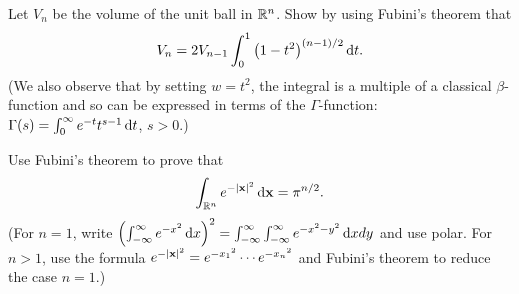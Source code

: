 \begin{problem}
  Let $V_n$ be the volume of the unit ball in $\mathbb{R}^n$. Show by using
  Fubini's theorem that
  \[
    V_n=2V_{n-1}\int_0^1\left(1-t^2\right)^{(n-1)/2}\mathop{}\!\mathrm{d} t.
  \]
  (We also observe that by setting $w=t^2$, the integral is a multiple of a
  classical $\beta$-function and so can be expressed in terms of the
  $\Gamma$-function: $\Gamma(s)=\int_0^\infty e^{-t}t^{s-1}\mathop{}\!\mathrm{d} t$,
  $s>0$.)
\end{problem}
\begin{solution}
\end{solution}

\begin{problem}
  Use Fubini's theorem to prove that
  \[
    \int_{\mathbb{R}^n}e^{-|\mathbf{x}|^2}\mathop{}\!\mathrm{d}\mathbf{x}=\pi^{n/2}.
  \]
  (For $n=1$, write
  $\left(\int_{-\infty}^\infty e^{-x^2}\mathop{}\!\mathrm{d}
    x\right)^2=\int_{-\infty}^\infty\int_{-\infty}^\infty e^{-x^2-y^2}\mathop{}\!\mathrm{d}
  xdy$ and use polar. For $n>1$, use the formula
  $e^{-|\mathbf{x}|^2}=e^{-{x_1}^2}\cdots e^{-{x_n}^2}$ and Fubini's theorem to
  reduce the case $n=1$.)
\end{problem}
\begin{solution}
\end{solution}

